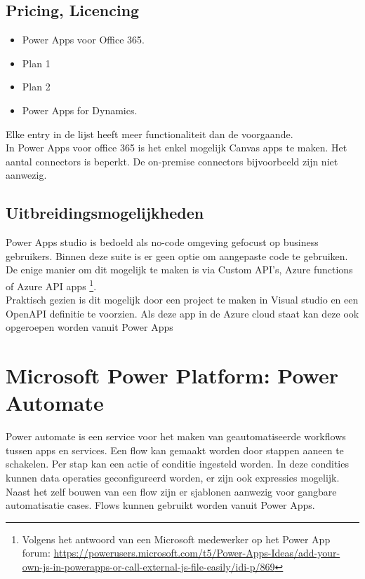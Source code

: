 
\subsection{Pricing, Licencing}

\begin{itemize}
    \item Power Apps voor Office 365.
    \item Plan 1
    \item Plan 2
    \item Power Apps for Dynamics.
\end{itemize} \autocite{Pohl2019}

Elke entry in de lijst heeft meer functionaliteit dan de voorgaande.\\
In Power Apps voor office 365 is het enkel mogelijk Canvas apps te maken. Het aantal connectors is beperkt. De on-premise connectors bijvoorbeeld zijn niet aanwezig.

\subsection{Uitbreidingsmogelijkheden}

Power Apps studio is bedoeld als no-code omgeving gefocust op business gebruikers. Binnen deze suite is er geen optie om aangepaste code te gebruiken. De enige manier om dit mogelijk te maken is via Custom API's, Azure functions of Azure API apps \footnote{Volgens het antwoord van een Microsoft medewerker op het Power App forum: \url{https://powerusers.microsoft.com/t5/Power-Apps-Ideas/add-your-own-js-in-powerapps-or-call-external-js-file-easily/idi-p/869}}.\\
Praktisch gezien is dit mogelijk door een project te maken in Visual studio en een OpenAPI definitie te voorzien. Als deze app in de Azure cloud staat kan deze ook opgeroepen worden vanuit Power Apps \autocite{Jugo2019}

\section{Microsoft Power Platform: Power Automate}

Power automate is een service voor het maken van geautomatiseerde workflows tussen apps en services. Een flow kan gemaakt worden door stappen aaneen te schakelen. Per stap kan een actie of conditie ingesteld worden. In deze condities kunnen data operaties geconfigureerd worden, er zijn ook expressies mogelijk. Naast het zelf bouwen van een flow zijn er sjablonen aanwezig voor gangbare automatisatie cases. Flows kunnen gebruikt worden vanuit Power Apps. \autocite{MicrosoftDocs2019f}

